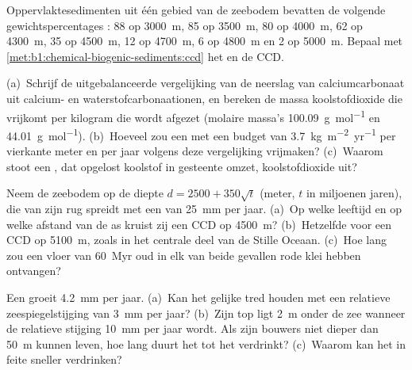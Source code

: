 \begin{exercise}[$\star$]\label{exo:b1:chemical-biogenic-sediments:4}
Oppervlaktesedimenten uit één gebied van de zeebodem bevatten de volgende gewichtspercentages : 88 op \qty{3000}{m}, 85 op \qty{3500}{m}, 80 op \qty{4000}{m}, 62 op \qty{4300}{m}, 35 op \qty{4500}{m}, 12 op \qty{4700}{m}, 6 op \qty{4800}{m} en 2 op \qty{5000}{m}. Bepaal met \cref{met:b1:chemical-biogenic-sediments:ccd} het  en de CCD.
\end{exercise}

\begin{exercise}[$\star\star$]\label{exo:b1:chemical-biogenic-sediments:5}
(a)~Schrijf de uitgebalanceerde vergelijking van de neerslag van calciumcarbonaat uit calcium- en waterstofcarbonaationen, en bereken de massa koolstofdioxide die vrijkomt per kilogram  die wordt afgezet (molaire massa's \qty{100.09}{g.mol^{-1}} en \qty{44.01}{g.mol^{-1}}). (b)~Hoeveel zou een  met een budget van \qty{3.7}{kg.m^{-2}.yr^{-1}} per vierkante meter en per jaar volgens deze vergelijking vrijmaken? (c)~Waarom stoot een , dat opgelost koolstof in gesteente omzet, koolstofdioxide uit?
\end{exercise}

\begin{exercise}[$\star\star$]\label{exo:b1:chemical-biogenic-sediments:6}
Neem de zeebodem op de diepte $d = 2500 + 350\sqrt t$ (meter, $t$ in miljoenen jaren), die van zijn rug spreidt met een  van \qty{25}{mm} per jaar. (a)~Op welke leeftijd en op welke afstand van de as kruist zij een CCD op \qty{4500}{m}? (b)~Hetzelfde voor een CCD op \qty{5100}{m}, zoals in het centrale deel van de Stille Oceaan. (c)~Hoe lang zou een vloer van \qty{60}{Myr} oud in elk van beide gevallen rode klei hebben ontvangen?
\end{exercise}

\begin{exercise}[$\star\star$]\label{exo:b1:chemical-biogenic-sediments:7}
Een  groeit \qty{4.2}{mm} per jaar. (a)~Kan het gelijke tred houden met een relatieve zeespiegelstijging van \qty{3}{mm} per jaar? (b)~Zijn top ligt \qty{2}{m} onder de zee wanneer de relatieve stijging \qty{10}{mm} per jaar wordt. Als zijn bouwers niet dieper dan \qty{50}{m} kunnen leven, hoe lang duurt het tot het verdrinkt? (c)~Waarom kan het in feite sneller verdrinken?
\end{exercise}

